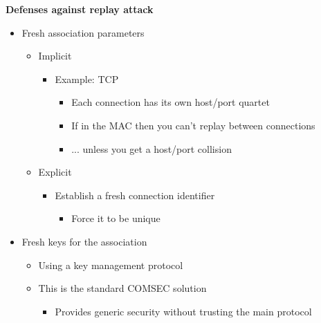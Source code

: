 \documentclass[helvetica]{seminar}
\newcommand{\heading}[1]{%
  \begin{center} 
    \large\bf 
    #1 
  \end{center} 
  \vspace{.4 in}}
\begin{document}
\begin{slide}
\heading{Defenses against replay attack}

\vspace{-.25 in}

\begin{itemize}
\item Fresh association parameters
\begin{itemize}
\item Implicit
\begin{itemize}
\item Example: TCP
\begin{itemize}
\item Each connection has its own host/port quartet
\item If in the MAC then you can't replay between connections
\item ... unless you get a host/port collision
\end{itemize}
\end{itemize}
\item Explicit
\begin{itemize}
\item Establish a fresh connection identifier
\begin{itemize}
\item Force it to be unique
\end{itemize}
\end{itemize}
\end{itemize}
\item Fresh keys for the association
\begin{itemize}
\item Using a key management protocol
\item This is the standard COMSEC solution
\begin{itemize}
\item Provides generic security without trusting the main protocol
\end{itemize}
\end{itemize}
\end{itemize}
\end{slide}
\end{document}
